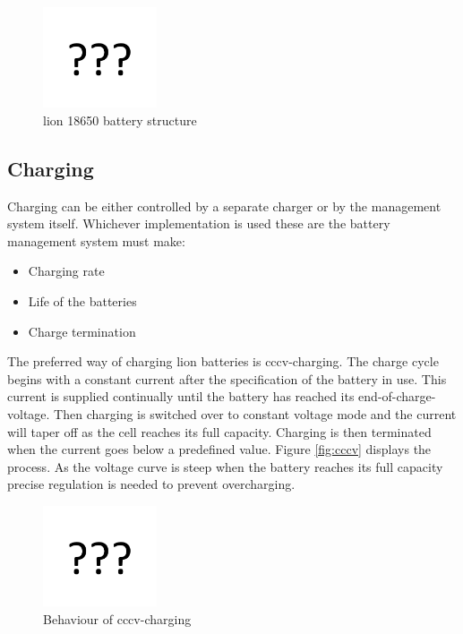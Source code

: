 \begin{figure}[H]
	\centering
	\includegraphics[width=0.3\textwidth]{Figures/missing.png}%
	\caption{\gls{lion} 18650 battery structure}
	\label{fig:cellstruct}
\end{figure}

\subsection{Charging}
Charging can be either controlled by a separate charger or by the management system itself. Whichever implementation is used these are the battery management system must make\cite{book111}:

\begin{itemize}[noitemsep]
	\item Charging rate
	\item Life of the batteries
	\item Charge termination
\end{itemize}

The preferred way of charging \gls{lion} batteries is \gls{cccv}-charging. The charge cycle begins with a constant current after the specification of the battery in use. This current is supplied continually until the battery has reached its end-of-charge-voltage. Then charging is switched over to constant voltage mode and the current will taper off as the cell reaches its full capacity. Charging is then terminated when the current goes below a predefined value. Figure \autoref{fig:cccv} displays the process. As the voltage curve is steep when the battery reaches its full capacity precise regulation is needed to prevent overcharging\cite{cccv}\cite{book112}.

\begin{figure}[H]
	\centering
	\includegraphics[width=0.3\textwidth]{Figures/missing.png} %
	\caption{Behaviour of \gls{cccv}-charging}
	\label{fig:cccv}
\end{figure}

